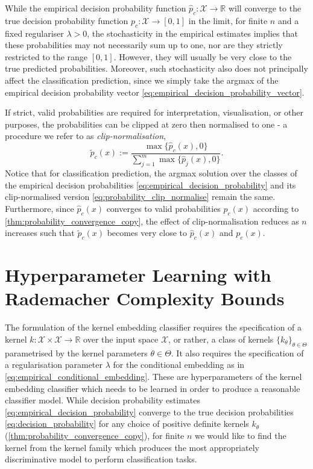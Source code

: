 \documentclass{article}
\begin{document}
	While the empirical decision probability function $\hat{p}_{c} : \mathcal{X} \to \mathbb{R}$ will converge to the true decision probability function  $p_{c} : \mathcal{X} \to [0, 1]$ in the limit, for finite $n$ and a fixed regulariser $\lambda > 0$, the stochasticity in the empirical estimates implies that these probabilities may not necessarily sum up to one, nor are they strictly restricted to the range $[0, 1]$. However, they will usually be very close to the true predicted probabilities. Moreover, such stochasticity also does not principally affect the classification prediction, since we simply take the argmax of the empirical decision probability vector \eqref{eq:empirical_decision_probability_vector}.
	
	If strict, valid probabilities are required for interpretation, visualisation, or other purposes, the probabilities can be clipped at zero then normalised to one - a procedure we refer to as \textit{clip-normalisation},
	\begin{equation}
		\tilde{p}_{c}(x) := \frac{\max\{\hat{p}_{c}(x), 0\}}{\sum_{j = 1}^{m} \max\{\hat{p}_{j}(x), 0\}}.
	\label{eq:probability_clip_normalise}
	\end{equation}
	Notice that for classification prediction, the argmax solution over the classes of the empirical decision probabilities \eqref{eq:empirical_decision_probability} and its clip-normalised version \eqref{eq:probability_clip_normalise} remain the same. Furthermore, since $\hat{p}_{c}(x)$ converges to valid probabilities $p_{c}(x)$ according to \cref{thm:probability_convergence_copy}, the effect of clip-normalisation reduces as $n$ increases such that $\tilde{p}_{c}(x)$ becomes very close to $\hat{p}_{c}(x)$ and $p_{c}(x)$.
	
\section{Hyperparameter Learning with Rademacher Complexity Bounds}
\label{sec:hyperparameter_learning}

	The formulation of the kernel embedding classifier requires the specification of a kernel $k : \mathcal{X} \times \mathcal{X} \to \mathbb{R}$ over the input space $\mathcal{X}$, or rather, a class of kernels $\{k_{\theta}\}_{\theta \in \Theta}$ parametrised by the kernel parameters $\theta \in \Theta$. It also requires the specification of a regularisation parameter $\lambda$ for the conditional embedding as in \eqref{eq:empirical_conditional_embedding}. These are hyperparameters of the kernel embedding classifier which needs to be learned in order to produce a reasonable classifier model. While decision probability estimates \eqref{eq:empirical_decision_probability} converge to the true decision probabilities \eqref{eq:decision_probability} for any choice of positive definite kernels $k_{\theta}$ (\cref{thm:probability_convergence_copy}), for finite $n$ we would like to find the kernel from the kernel family which produces the most appropriately discriminative model to perform classification tasks.
\end{document}
